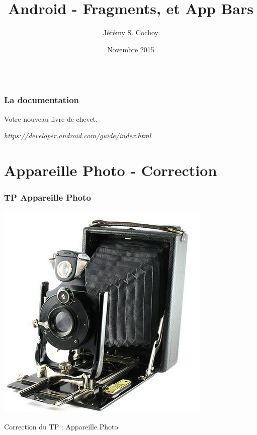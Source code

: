 \documentclass{beamer}
\begin{document}
\title{Android - Fragments, et App Bars}
\author{Jérémy S. Cochoy}
\date{Novembre 2015}


\begin{frame}
\titlepage
\end{frame}

\begin{frame}
  \begin{columns}[t]
  \begin{column}{5cm}
  \tableofcontents[sections={1-3}]
  \end{column}
  \begin{column}{5cm}
  \tableofcontents[sections={4-8}]
  \end{column}
  \end{columns}
\end{frame}

\begin{frame}
\frametitle{La documentation}

\begin{block}{Votre nouveau livre de chevet.}
\begin{center}
\emph{https://developer.android.com/guide/index.html}
\end{center}
\end{block}

\end{frame}

\section{Appareille Photo - Correction}

\begin{frame}
\frametitle{TP Appareille Photo}
\begin{center}
\includegraphics[scale=0.4]{appareil-photo-vintage.jpg}
\end{center}
\begin{block}{}
\begin{center}
Correction du TP : Appareille Photo
\end{center}
\end{block}
\end{frame}
\end{document}
